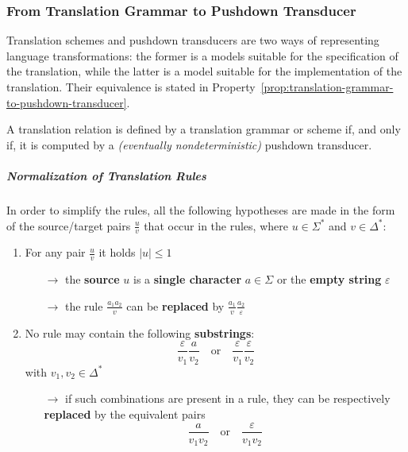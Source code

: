 \documentclass[english]{article}
\begin{document}
\subsubsection{From Translation Grammar to Pushdown Transducer}

Translation schemes and pushdown transducers are two ways of representing language transformations:
the former is a models suitable for the specification of the translation, while the latter is a model suitable for the implementation of the translation.
Their equivalence is stated in Property~\ref{prop:translation-grammar-to-pushdown-transducer}.

\begin{property}
  \label{prop:translation-grammar-to-pushdown-transducer}
  A translation relation is defined by a translation grammar or scheme if, and only if, it is computed by a \textit{(eventually nondeterministic)} pushdown transducer.
\end{property}

\subparagraph*{Normalization of Translation Rules}

In order to simplify the rules, all the following hypotheses are made in the form of the source/target pairs \(\frac{u}{v}\) that occur in the rules, where \(u \in \Sigma^\ast\) and \(v \in \Delta^\ast\):

\begin{enumerate}
  \item For any pair \(\frac{u}{v}\) it holds \(|u| \leq 1\)
        \begin{itemize}
          \item[\(\rightarrow\)] the \textbf{source} \(u\) is a \textbf{single character} \(a \in \Sigma\) or the \textbf{empty string} \(\varepsilon\)
          \item[\(\rightarrow\)] the rule \(\frac{a_1 a_2}{v}\) can be \textbf{replaced} by \(\frac{a_1}{v}\frac{a_2}{\varepsilon}\)
        \end{itemize}
  \item No rule may contain the following \textbf{substrings}:
        \[ \dfrac{\varepsilon}{v_1} \dfrac{a}{v_2} \quad \text{or} \quad \dfrac{\varepsilon}{v_1} \dfrac{\varepsilon}{v_2} \]
        with \(v_1, v_2 \in \Delta^\ast\)
        \begin{itemize}
          \item[\(\rightarrow\)] if such combinations are present in a rule, they can be respectively \textbf{replaced} by the equivalent pairs
            \[ \dfrac{a}{v_1 v_2} \quad \text{or} \quad \dfrac{\varepsilon}{v_1 v_2} \]
        \end{itemize}
\end{enumerate}
\end{document}

